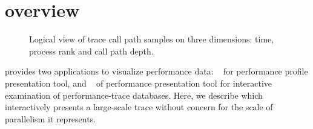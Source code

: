 


\newcommand{\crosshair}{crosshair}
\newcommand{\traceview}{Trace view}
\newcommand{\depthview}{Depth view}
\newcommand{\summaryview}{Summary view}
\newcommand{\miniview}{Mini map view}
\newcommand{\callview}{Call path view}



\section{\hpctraceviewer{} overview}

\begin{figure}[t]
\caption{Logical view of trace call path samples on three dimensions: time, process rank and call path depth.}
\label{fig:hpctraceviewer-callpath}
\end{figure}

\HPCToolkit{} provides two applications to visualize performance data: \hpcviewer{}~\cite{Adhianto-MC-Ta:2010:PSTI-hpcviewer} for performance profile presentation tool, and \hpctraceviewer{}~\cite{Tallent-MC-etal:2011:ICS-hpctoolkit-scalable-tracing} of performance presentation tool for interactive examination of performance-trace databases.
Here, we describe \hpctraceviewer{} which interactively presents a large-scale trace without concern for the scale of parallelism it represents.

